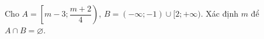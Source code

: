 \begin{bt}%
	Cho $A=\left[m-3; \dfrac{m+2}{4}\right)$, $B=(-\infty;-1) \cup [2;+\infty)$. Xác định $m$ để  ${A \cap B=\varnothing}$.
\end{bt}
